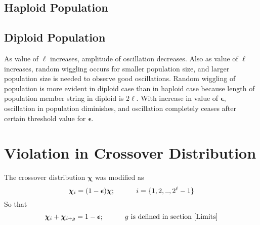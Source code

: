 \subsection{Haploid Population}




\subsection{Diploid Population}




As value of $\ell$ increases, amplitude of oscillation decreases. 
Also as value of $\ell$ increases, random wiggling occurs for smaller population size, 
and larger population size is needed to observe good oscillations. Random wiggling of 
population is more evident in diploid case than in haploid case because length of 
population member string in diploid is $2\ell$. With increase in value of $\bm{\epsilon}$, 
oscillation in population diminishes, and oscillation completely ceases after certain threshold value for $\bm{\epsilon}$. 

\section{Violation in Crossover Distribution}
The crossover distribution $\bm{\chi}$ was modified as
\[
\bm{\chi}_i = (1-\bm{\epsilon}) \bm{\chi} ; \hspace{30pt} i = \{1, 2,.., 2^{\ell}-1\} 
\]
So that 
\[
\bm{\chi}_i + \bm{\chi}_{i+g} = 1-\bm{\epsilon} ; \hspace{30pt} g \text{ is defined in  section } \ref{Limits}
\]

